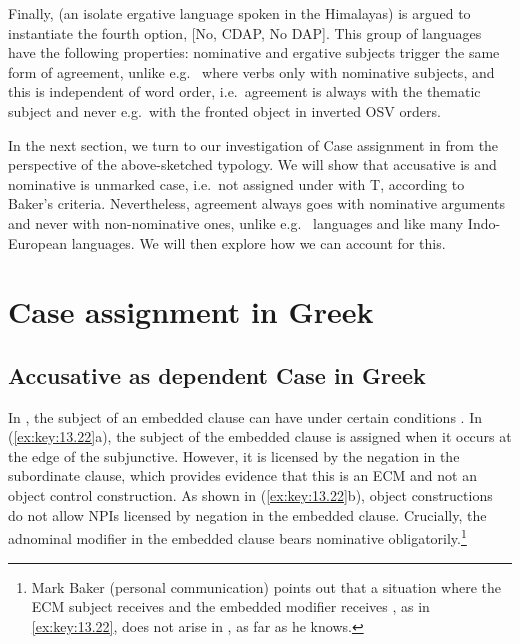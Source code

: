 \documentclass[output=paper]{langsci/langscibook}
\begin{document}
Finally,  (an isolate ergative language spoken in the Himalayas) is
argued to instantiate the fourth option, [No, \gls{CDAP}, No \gls{DAP}]. This group of
languages have the following properties: nominative and ergative subjects
trigger the same form of agreement, unlike e.g.\  where verbs  only
with nominative subjects, and this is independent of word order, i.e.\ agreement
is always with the thematic subject and never e.g.\ with the fronted object in
inverted OSV orders.

In the next section, we turn to our investigation of Case assignment in
 from the perspective of the above-sketched typology. We will show
that accusative is  and
nominative is unmarked case, i.e.\ not assigned under
 with T, according to Baker’s criteria. Nevertheless, agreement
always goes with nominative arguments and never with
non-nominative ones, unlike e.g.\  languages and like many Indo-European
languages. We will then explore how we can account for this.

\section{Case assignment in Greek}

\subsection{Accusative as dependent Case in Greek}

In , the subject of an embedded clause can have \Acc{} under certain
conditions \parencite{Iatridou1993,KotzPapa2007}. In (\ref{ex:key:13.22}a), the
subject of the embedded clause is assigned \Acc{} when it occurs at the edge of
the subjunctive. However, it is licensed by the negation in the subordinate
clause, which provides evidence that this is an \gls{ECM} and not an object
control construction. As shown in (\ref{ex:key:13.22}b), object 
constructions do not allow \glspl{NPI} licensed by negation in the embedded
clause.  Crucially, the adnominal modifier in the embedded clause bears
nominative obligatorily.\footnote{Mark Baker (personal
    communication) points out that a situation where the \gls{ECM} subject
receives \Acc{} and the embedded modifier receives \Nom{}, as in
\eqref{ex:key:13.22}, does not arise in , as far as he knows.}
\end{document}
